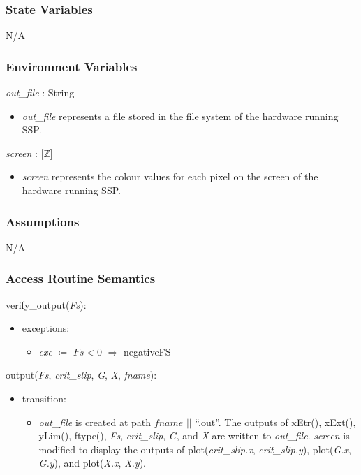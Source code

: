 \documentclass[12pt, titlepage]{article}
\newcommand{\progname}{SSP}
\begin{document}
\subsubsection{State Variables}
N/A

\subsubsection{Environment Variables}

\textit{out\_file} : String
\begin{itemize}
	\item \textit{out\_file} represents a file stored in the file system of the 
	hardware running \progname{}. \\
\end{itemize}

\noindent \textit{screen} : [$\mathbb{Z}$]
\begin{itemize}
	\item \textit{screen} represents the colour values for each pixel on the 
	screen of the hardware running \progname{}. \\
\end{itemize}

\subsubsection{Assumptions}
N/A

\subsubsection{Access Routine Semantics}
verify\_output(\textit{Fs}):
\begin{itemize}
	\item exceptions:
	\begin{itemize}
		\item[] \textit{exc} $\coloneqq$ $\textit{Fs} < 0$ 
		$\Rightarrow$ negativeFS\\
	\end{itemize}
\end{itemize}

\noindent output(\textit{Fs}, \textit{crit\_slip}, \textit{G}, \textit{X}, 
\textit{fname}):
\begin{itemize}
	\item transition:
	\begin{itemize}
		\item[] \textit{out\_file} is created at path $\textit{fname}$ $||$ 
		``.out''. The outputs of xEtr(), xExt(), yLim(), ftype(), \textit{Fs}, 
		\textit{crit\_slip}, \textit{G}, and \textit{X} are written to 
		\textit{out\_file}.
		\textit{screen} is modified to display the outputs of 
		plot(\textit{crit\_slip.x}, \textit{crit\_slip.y}), plot(\textit{G.x}, 
		\textit{G.y}), and plot(\textit{X.x}, \textit{X.y}).  \\
	\end{itemize}
\end{itemize}
\end{document}
